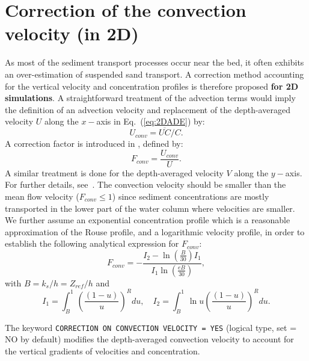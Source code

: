 \section{Correction of the convection velocity (in 2D)}
As most of the sediment transport processes occur near the bed, it often exhibits an over-estimation of suspended sand transport.
A correction method accounting for the vertical velocity and concentration profiles is therefore proposed {\bf for 2D simulations}. A straightforward treatment of the advection terms would imply the
definition of an advection velocity and replacement of the depth-averaged
velocity $U$ along the $x-$axis in Eq.~(\ref{eq:2DADE}) by:
\begin{equation*}
U_{conv} = \overline{UC}/C.
\end{equation*}
A correction factor is introduced in \gaia, defined by:
\begin{equation*}
F_{conv} =\frac{U_{conv}}{U}.
\end{equation*}
A similar treatment is done for the depth-averaged velocity $V$ along the $y-$axis. For further details, see~\cite{Huybrechts}.
The convection velocity should be smaller than the mean flow velocity ($F_{conv} \leq 1$) since sediment concentrations are mostly transported in the lower part of the water column where velocities are smaller. We further
assume an exponential concentration profile which is a reasonable
approximation of the Rouse profile, and a logarithmic velocity profile, in
order to establish the following analytical expression for $F_{conv}$:
\begin{equation*}
F_{conv} =-\frac{I_2 - \ln\left(\frac{B}{30}\right) I_1}{I_1 \ln\left(
\frac{eB}{30}\right)},
\end{equation*}
with $B=k_s/h = Z_{ref}/h$ and
\begin{equation*}
I_1 =\int_B^1\left(\frac{(1-u)}{u}\right)^R du,\quad I_2 = \int_B^1 \ln u \left(\frac{(1-u)}{u} \right)^R du.
\end{equation*}

The keyword \texttt{CORRECTION ON CONVECTION VELOCITY = YES} (logical type, set {\ttfamily = NO} by default) modifies the depth-averaged convection velocity to account for the vertical gradients of velocities and concentration.

